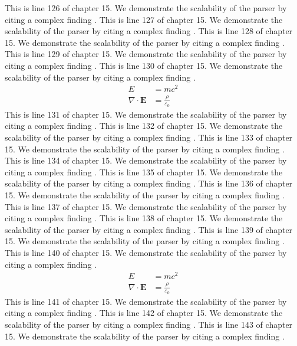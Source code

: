 This is line 126 of chapter 15. We demonstrate the scalability of the parser by citing a complex finding \cite{ref15_126}.
This is line 127 of chapter 15. We demonstrate the scalability of the parser by citing a complex finding \cite{ref15_127}.
This is line 128 of chapter 15. We demonstrate the scalability of the parser by citing a complex finding \cite{ref15_128}.
This is line 129 of chapter 15. We demonstrate the scalability of the parser by citing a complex finding \cite{ref15_129}.
This is line 130 of chapter 15. We demonstrate the scalability of the parser by citing a complex finding \cite{ref15_130}.
\begin{align*}
  E &= mc^2 \\
  \nabla \cdot \mathbf{E} &= \frac{\rho}{\varepsilon_0}
\end{align*}
This is line 131 of chapter 15. We demonstrate the scalability of the parser by citing a complex finding \cite{ref15_131}.
This is line 132 of chapter 15. We demonstrate the scalability of the parser by citing a complex finding \cite{ref15_132}.
This is line 133 of chapter 15. We demonstrate the scalability of the parser by citing a complex finding \cite{ref15_133}.
This is line 134 of chapter 15. We demonstrate the scalability of the parser by citing a complex finding \cite{ref15_134}.
This is line 135 of chapter 15. We demonstrate the scalability of the parser by citing a complex finding \cite{ref15_135}.
This is line 136 of chapter 15. We demonstrate the scalability of the parser by citing a complex finding \cite{ref15_136}.
This is line 137 of chapter 15. We demonstrate the scalability of the parser by citing a complex finding \cite{ref15_137}.
This is line 138 of chapter 15. We demonstrate the scalability of the parser by citing a complex finding \cite{ref15_138}.
This is line 139 of chapter 15. We demonstrate the scalability of the parser by citing a complex finding \cite{ref15_139}.
This is line 140 of chapter 15. We demonstrate the scalability of the parser by citing a complex finding \cite{ref15_140}.
\begin{align*}
  E &= mc^2 \\
  \nabla \cdot \mathbf{E} &= \frac{\rho}{\varepsilon_0}
\end{align*}
This is line 141 of chapter 15. We demonstrate the scalability of the parser by citing a complex finding \cite{ref15_141}.
This is line 142 of chapter 15. We demonstrate the scalability of the parser by citing a complex finding \cite{ref15_142}.
This is line 143 of chapter 15. We demonstrate the scalability of the parser by citing a complex finding \cite{ref15_143}.

